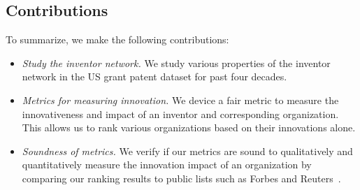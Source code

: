 \subsection{Contributions}

To summarize, we make the following contributions:

	\begin{itemize} 
	\squish
		\item {\em Study the inventor network.} We study various properties of the inventor network in the US grant patent dataset for past four decades.  
		\item {\em Metrics for measuring innovation.} We device a fair metric to measure the innovativeness and impact of an inventor and corresponding organization. This allows us to rank various organizations based on their innovations alone. 
		\item {\em Soundness of metrics.} We verify if our metrics are sound to qualitatively and quantitatively measure the innovation impact of an organization by comparing our ranking results to public lists such as Forbes and Reuters~\cite{forbes, top100}.
	\end{itemize}